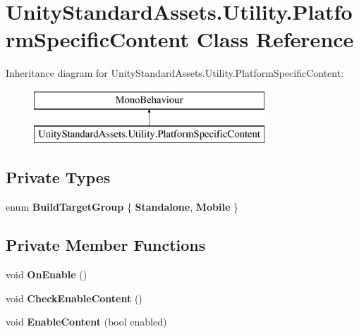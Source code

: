 \hypertarget{class_unity_standard_assets_1_1_utility_1_1_platform_specific_content}{}\section{Unity\+Standard\+Assets.\+Utility.\+Platform\+Specific\+Content Class Reference}
\label{class_unity_standard_assets_1_1_utility_1_1_platform_specific_content}
Inheritance diagram for Unity\+Standard\+Assets.\+Utility.\+Platform\+Specific\+Content\+:\begin{figure}[H]
\begin{center}
\leavevmode
\includegraphics[height=2.000000cm]{class_unity_standard_assets_1_1_utility_1_1_platform_specific_content}
\end{center}
\end{figure}
\subsection*{Private Types}
\begin{DoxyCompactItemize}
\item 
\mbox{\label{class_unity_standard_assets_1_1_utility_1_1_platform_specific_content_ae840f08c0c4da7048fb16ccc699fe58d}} 
enum {\bfseries Build\+Target\+Group} \{ {\bfseries Standalone}, 
{\bfseries Mobile}
 \}
\end{DoxyCompactItemize}
\subsection*{Private Member Functions}
\begin{DoxyCompactItemize}
\item 
\mbox{\label{class_unity_standard_assets_1_1_utility_1_1_platform_specific_content_ad01ac8953e26b41559858d53bc958cce}} 
void {\bfseries On\+Enable} ()
\item 
\mbox{\label{class_unity_standard_assets_1_1_utility_1_1_platform_specific_content_a1f73bb31cebcd7c1fe29b89ae0ba71c2}} 
void {\bfseries Check\+Enable\+Content} ()
\item 
\mbox{\label{class_unity_standard_assets_1_1_utility_1_1_platform_specific_content_ab9e4d51436b91d63493118402958043b}} 
void {\bfseries Enable\+Content} (bool enabled)
\end{DoxyCompactItemize}
